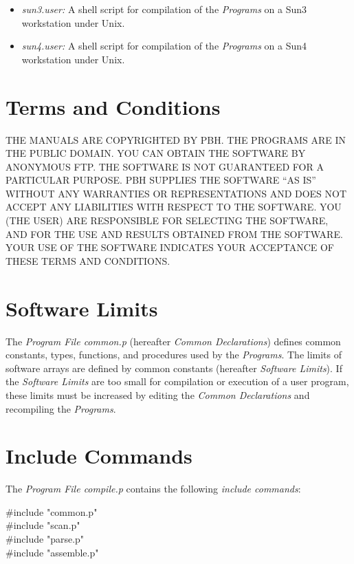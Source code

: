 \begin{itemize}
  \item
  {\it sun3.user:} A shell script for compilation of the
  {\it Programs} on a Sun3 workstation under Unix.
  \item
  {\it sun4.user:} A shell script for compilation of the
  {\it Programs} on a Sun4 workstation under Unix.
\end{itemize}


\section{Terms and Conditions}

\begin{it}
  THE MANUALS ARE COPYRIGHTED BY PBH. THE PROGRAMS ARE IN THE
  PUBLIC DOMAIN. YOU CAN OBTAIN THE SOFTWARE BY ANONYMOUS FTP.
  THE SOFTWARE IS NOT GUARANTEED FOR A PARTICULAR PURPOSE. PBH
  SUPPLIES THE SOFTWARE ``AS IS'' WITHOUT ANY WARRANTIES OR
  REPRESENTATIONS AND DOES NOT ACCEPT ANY LIABILITIES WITH
  RESPECT TO THE SOFTWARE.
  YOU (THE USER) ARE RESPONSIBLE FOR SELECTING THE SOFTWARE, AND
  FOR THE USE AND RESULTS OBTAINED FROM THE SOFTWARE. YOUR USE
  OF THE SOFTWARE INDICATES YOUR ACCEPTANCE OF THESE TERMS AND
  CONDITIONS.
\end{it}


\section{Software Limits}

The {\it Program File common.p} (hereafter {\it Common
Declarations}) defines common constants, types, functions, and
procedures used by the {\it Programs}. The limits of software
arrays are defined by common constants (hereafter {\it Software
Limits}). If the {\it Software Limits} are too small for
compilation or execution of a user program, these limits must
be increased by editing the {\it Common Declarations} and
recompiling the {\it Programs}.


\section{Include Commands}

The {\it Program File compile.p} contains the following {\it
include commands}:

\begin{program}{10.0em}
  {\PA}{\#}include "common.p"  \\
  {\PA}{\#}include "scan.p"    \\
  {\PA}{\#}include "parse.p"   \\
  {\PA}{\#}include "assemble.p"\\
\end{program}

